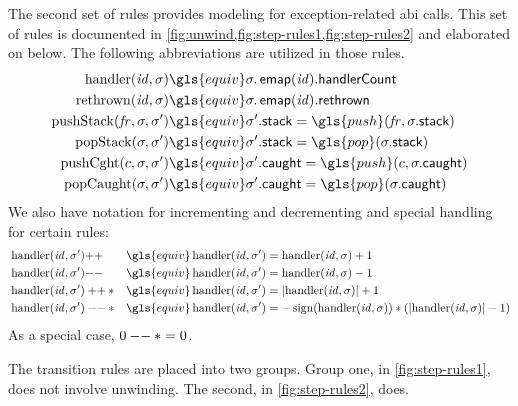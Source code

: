 The second set of rules provides modeling for exception-related \gls{abi} calls.
This set of rules is documented in \cref{fig:unwind,fig:step-rules1,fig:step-rules2} and elaborated on below.
The following abbreviations are utilized in those rules.
\begin{align}
  \handler(\id,\sigma) &\gls{equiv} \sigma.\emap(\id).\handlerCount \\
  \reth(\id,\sigma) &\gls{equiv} \sigma.\emap(\id).\rethrown \\
  \pushStack(\mathit{fr},\sigma,\sigma') &\gls{equiv} \sigma'.\stack=\gls{push}(\mathit{fr},\sigma.\stack) \\
  \popStack(\sigma,\sigma') &\gls{equiv} \sigma'.\stack=\gls{pop}(\sigma.\stack) \\
  \pushCaught(c,\sigma,\sigma') &\gls{equiv} \sigma'.\caught=\gls{push}(c,\sigma.\caught) \\
  \popCaught(\sigma,\sigma') &\gls{equiv} \sigma'.\caught=\gls{pop}(\sigma.\caught)
\end{align}
We also have notation for incrementing and decrementing and special handling for certain rules:
\begin{align}
  &\handler(\id,\sigma')\inc & \gls{equiv}\handler(\id,\sigma') &= \handler(\id,\sigma)+1 \\
  &\handler(\id,\sigma')\dec & \gls{equiv}\handler(\id,\sigma') &= \handler(\id,\sigma)-1 \\
  &\handler(\id,\sigma')\inc* & \gls{equiv}\handler(\id,\sigma') &= \abs{\handler(\id,\sigma)}+1 \\
  &\handler(\id,\sigma')\dec* & \gls{equiv}\handler(\id,\sigma') &= -\operatorname{sign}(\handler(\id,\sigma))*(\abs{\handler(\id,\sigma)}-1)
\end{align}
As a special case, $0\mathbin{--}*=0$.

The transition rules are placed into two groups.
Group one, in \cref{fig:step-rules1}, does not involve unwinding.
The second, in \cref{fig:step-rules2}, does.

